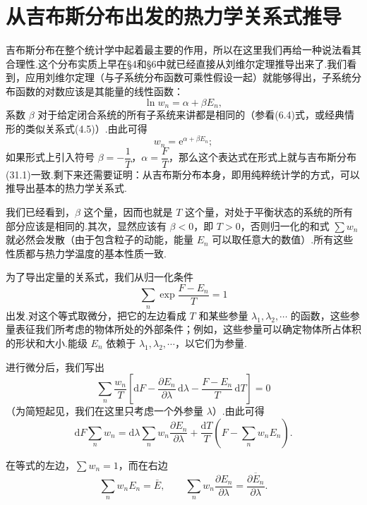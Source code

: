 \section{从吉布斯分布出发的热力学关系式推导}

吉布斯分布在整个统计学中起着最主要的作用，所以在这里我们再给一种说法看其合理性.这个分布实质上早在§4和§6中就已经直接从刘维尔定理推导出来了.我们看到，应用刘维尔定理（与子系统分布函数可乘性假设一起）就能够得出，子系统分布函数的对数应该是其能量的线性函数：
\begin{equation}
  \ln w_n=\alpha+\beta E_n,
\end{equation}
系数 $\beta$ 对于给定闭合系统的所有子系统来讲都是相同的（参看(6.4)式，或经典情形的类似关系式(4.5)）.由此可得
\begin{equation*}
  w_n=\mathrm{e}^{\alpha+\beta E_n};
\end{equation*}
如果形式上引入符号 $\beta=-\dfrac{1}{T}$，$\alpha=\dfrac{F}{T}$，那么这个表达式在形式上就与吉布斯分布(31.1)一致.剩下来还需要证明：从吉布斯分布本身，即用纯粹统计学的方式，可以推导出基本的热力学关系式.

我们已经看到，$\beta$ 这个量，因而也就是 $T$ 这个量，对处于平衡状态的系统的所有部分应该是相同的.其次，显然应该有 $\beta<0$，即 $T>0$，否则归一化的和式 $\sum w_n$ 就必然会发散（由于包含粒子的动能，能量 $E_n$ 可以取任意大的数值）.所有这些性质都与热力学温度的基本性质一致.

为了导出定量的关系式，我们从归一化条件
\begin{equation*}
  \sum_n\exp\frac{F-E_n}{T}=1
\end{equation*}
出发.对这个等式取微分，把它的左边看成 $T$ 和某些参量 $\lambda_1,\lambda_2,\cdots$ 的函数，这些参量表征我们所考虑的物体所处的外部条件；例如，这些参量可以确定物体所占体积的形状和大小.能级 $E_n$ 依赖于 $\lambda_1,\lambda_2,\cdots$，以它们为参量.

进行微分后，我们写出
\begin{equation*}
  \sum_n\frac{w_n}{T}\left[\mathrm{d}F-\frac{\partial E_n}{\partial\lambda}\,\mathrm{d}\lambda
  -\frac{F-E_n}{T}\,\mathrm{d}T\right]=0
\end{equation*}
（为简短起见，我们在这里只考虑一个外参量 $\lambda$）.由此可得
\begin{equation*}
  \mathrm{d}F\sum_n w_n=\mathrm{d}\lambda\sum_n w_n\frac{\partial E_n}{\partial\lambda}
  +\frac{\mathrm{d}T}{T}\left(F-\sum_n w_nE_n\right).
\end{equation*}

在等式的左边，$\sum w_n=1$，而在右边
\begin{equation*}
  \sum_n w_nE_n=\bar{E},\qquad
  \sum_n w_n\frac{\partial E_n}{\partial\lambda}
  =\overline{\frac{\partial E_n}{\partial\lambda}}.
\end{equation*}

